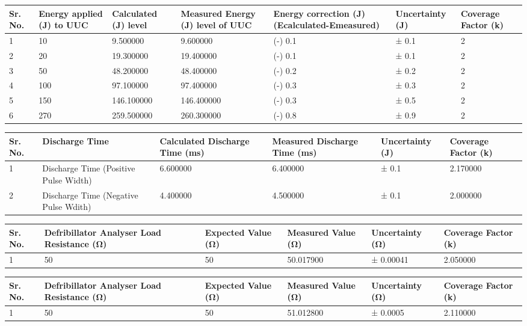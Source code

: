\begin{tabular}{p{0.5cm}|p{2.6666666666666665 cm}|p{2.6666666666666665 cm}|p{2.6666666666666665 cm}|p{2.6666666666666665 cm}|p{2.6666666666666665 cm}|p{2.6666666666666665 cm}}
\toprule
Sr. No. & Energy applied (J) to UUC & Calculated (J) level & Measured Energy (J) level of UUC & Energy correction (J) (Ecalculated-Emeasured) & Uncertainty (J) & Coverage Factor (k) \\
\midrule
1 & 10 & 9.500000 & 9.600000 & (-) 0.1 & ± 0.1 & 2 \\
2 & 20 & 19.300000 & 19.400000 & (-) 0.1 & ± 0.1 & 2 \\
3 & 50 & 48.200000 & 48.400000 & (-) 0.2 & ± 0.2 & 2 \\
4 & 100 & 97.100000 & 97.400000 & (-) 0.3 & ± 0.3 & 2 \\
5 & 150 & 146.100000 & 146.400000 & (-) 0.3 & ± 0.5 & 2 \\
6 & 270 & 259.500000 & 260.300000 & (-) 0.8 & ± 0.9 & 2 \\
\bottomrule
\end{tabular}
\break\break\begin{tabular}{p{0.5cm}|p{3.2 cm}|p{3.2 cm}|p{3.2 cm}|p{3.2 cm}|p{3.2 cm}}
\toprule
Sr. No. & Discharge Time & Calculated Discharge Time (ms) & Measured Discharge Time (ms) & Uncertainty (J) & Coverage Factor (k) \\
\midrule
1 & Discharge Time (Positive Pulse Width) & 6.600000 & 6.400000 & ± 0.1 & 2.170000 \\
2 & Discharge Time (Negative Pulse Wdith) & 4.400000 & 4.500000 & ± 0.1 & 2.000000 \\
\bottomrule
\end{tabular}
\break\break\begin{tabular}{p{0.5cm}|p{3.2 cm}|p{3.2 cm}|p{3.2 cm}|p{3.2 cm}|p{3.2 cm}}
\toprule
Sr. No. & Defribillator Analyser Load Resistance (Ω) & Expected Value (Ω) & Measured Value (Ω) & Uncertainty (Ω) & Coverage Factor (k) \\
\midrule
1 & 50 & 50 & 50.017900 &  ± 0.00041 & 2.050000 \\
\bottomrule
\end{tabular}
\break\break\begin{tabular}{p{0.5cm}|p{3.2 cm}|p{3.2 cm}|p{3.2 cm}|p{3.2 cm}|p{3.2 cm}}
\toprule
Sr. No. & Defribillator Analyser Load Resistance (Ω) & Expected Value (Ω) & Measured Value (Ω) & Uncertainty (Ω) & Coverage Factor (k) \\
\midrule
1 & 50 & 50 & 51.012800 &  ± 0.0005 & 2.110000 \\
\bottomrule
\end{tabular}
\break\break